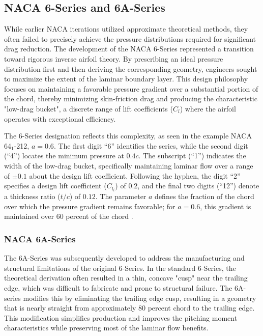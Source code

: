 
\subsection*{NACA 6-Series and 6A-Series}

While earlier NACA iterations utilized approximate theoretical methods, they often failed to precisely achieve the pressure distributions required for significant drag reduction. 
The development of the NACA 6-Series represented a transition toward rigorous inverse airfoil theory. 
By prescribing an ideal pressure distribution first and then deriving the corresponding geometry, engineers sought to maximize the extent of the laminar boundary layer. 
This design philosophy focuses on maintaining a favorable pressure gradient over a substantial portion of the chord, thereby minimizing skin-friction drag and producing the characteristic "low-drag bucket", a discrete range of lift coefficients ($C_l$) where the airfoil operates with exceptional efficiency.

The 6-Series designation reflects this complexity, as seen in the example NACA 64$_1$-212, $a=0.6$. The first digit ``6'' identifies the series, while the second digit (``4'') locates the minimum pressure at $0.4c$. 
The subscript (``1'') indicates the width of the low-drag bucket, specifically maintaining laminar flow over a range of $\pm 0.1$ about the design lift coefficient. 
Following the hyphen, the digit ``2'' specifies a design lift coefficient ($C_{l_i}$) of $0.2$, and the final two digits (``12'') denote a thickness ratio ($t/c$) of $0.12$. 
The parameter $a$ defines the fraction of the chord over which the pressure gradient remains favorable; for $a=0.6$, this gradient is maintained over 60 percent of the chord \cite{NACA_TR_824}.


\subsubsection{NACA 6A-Series}

The 6A-Series was subsequently developed to address the manufacturing and structural limitations of the original 6-Series. 
In the standard 6-Series, the theoretical derivation often resulted in a thin, concave "cusp" near the trailing edge, which was difficult to fabricate and prone to structural failure. 
The 6A-series modifies this by eliminating the trailing edge cusp, resulting in a geometry that is nearly straight from approximately 80 percent chord to the trailing edge. 
This modification simplifies production and improves the pitching moment characteristics while preserving most of the laminar flow benefits.

